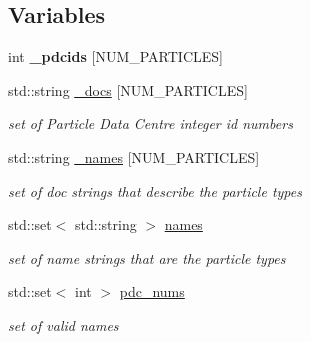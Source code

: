 \subsection*{Variables}
\begin{DoxyCompactItemize}
\item 
\mbox{\label{namespacepyne_1_1particle_a837e7a84e956daa26b260b2e0f82c7da}} 
int {\bfseries \+\_\+pdcids} \mbox{[}N\+U\+M\+\_\+\+P\+A\+R\+T\+I\+C\+L\+ES\mbox{]}
\item 
\mbox{\label{namespacepyne_1_1particle_a314943f4f5f6771159923be697ecb2d2}} 
std\+::string \hyperlink{namespacepyne_1_1particle_a314943f4f5f6771159923be697ecb2d2}{\+\_\+docs} \mbox{[}N\+U\+M\+\_\+\+P\+A\+R\+T\+I\+C\+L\+ES\mbox{]}
\begin{DoxyCompactList}\small\item\em set of Particle Data Centre integer id numbers \end{DoxyCompactList}\item 
\mbox{\label{namespacepyne_1_1particle_a7c7f44732bf4519e8586388217d241b0}} 
std\+::string \hyperlink{namespacepyne_1_1particle_a7c7f44732bf4519e8586388217d241b0}{\+\_\+names} \mbox{[}N\+U\+M\+\_\+\+P\+A\+R\+T\+I\+C\+L\+ES\mbox{]}
\begin{DoxyCompactList}\small\item\em set of doc strings that describe the particle types \end{DoxyCompactList}\item 
\mbox{\label{namespacepyne_1_1particle_a5281688f6cfd44c4c6cbed022dd145a7}} 
std\+::set$<$ std\+::string $>$ \hyperlink{namespacepyne_1_1particle_a5281688f6cfd44c4c6cbed022dd145a7}{names}
\begin{DoxyCompactList}\small\item\em set of name strings that are the particle types \end{DoxyCompactList}\item 
\mbox{\label{namespacepyne_1_1particle_aaed2c3e1223989afbb685d893cac1af8}} 
std\+::set$<$ int $>$ \hyperlink{namespacepyne_1_1particle_aaed2c3e1223989afbb685d893cac1af8}{pdc\+\_\+nums}
\begin{DoxyCompactList}\small\item\em set of valid names \end{DoxyCompactList}\item 

\end{DoxyCompactItemize}
